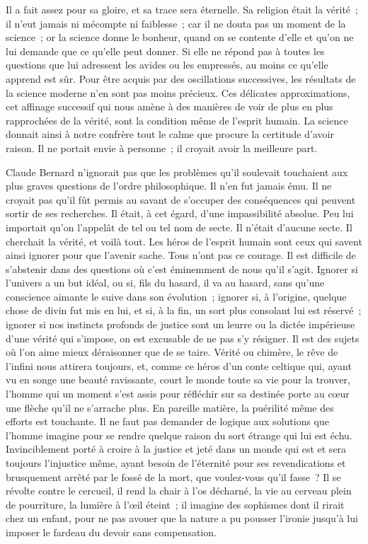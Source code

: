 \documentclass[french,twoside]{book} %
\newcommand\persName[1]{#1}
\begin{document}
Il a fait assez pour sa gloire, et sa trace sera éternelle. Sa religion était la vérité ; il n’eut jamais ni mécompte ni faiblesse ; car il ne douta pas un moment de la science ; or la science donne le bonheur, quand on se contente d’elle et qu’on ne lui demande que ce qu’elle peut donner. Si elle ne répond pas à toutes les questions que lui adressent les avides ou les empressés, au moins ce qu’elle apprend est sûr. Pour être acquis par des oscillations successives, les résultats de la science moderne n’en sont pas moins précieux. Ces délicates approximations, cet affinage successif qui nous amène à des manières de voir de plus en plus rapprochées de la vérité, sont la condition même de l’esprit humain. La science donnait ainsi à notre confrère tout le calme que procure la certitude d’avoir raison. Il ne portait envie à personne ; il croyait avoir la meilleure part.\par
{\persName Claude Bernard} n’ignorait pas que les problèmes qu’il soulevait touchaient aux plus graves questions de l’ordre philosophique. Il n’en fut jamais ému. Il ne croyait pas qu’il fût permis au savant de s’occuper des conséquences qui peuvent sortir de ses recherches. Il était, à cet égard, d’une impassibilité absolue. Peu lui importait qu’on l’appelât de tel ou tel nom de secte. Il n’était d’aucune secte. Il cherchait la vérité, et voilà tout. Les héros de l’esprit humain sont ceux qui savent ainsi ignorer pour que l’avenir sache. Tous n’ont pas ce courage. Il est difficile de s’abstenir dans des questions où c’est éminemment de nous qu’il s’agit. Ignorer si l’univers a un but idéal, ou si, fils du hasard, il va au hasard, sans qu’une conscience aimante le suive dans son évolution ; ignorer si, à l’origine, quelque chose de divin fut mis en lui, et si, à la fin, un sort plus consolant lui est réservé ; ignorer si nos instincts profonds de justice sont un leurre ou la dictée impérieuse d’une vérité qui s’impose, on est excusable de ne pas s’y résigner. Il est des sujets où l’on aime mieux déraisonner que de se taire. Vérité ou chimère, le rêve de l’infini nous attirera toujours, et, comme ce héros d’un conte celtique qui, ayant vu en songe une beauté ravissante, court le monde toute sa vie pour la trouver, l’homme qui un moment s’est assis pour réfléchir sur sa destinée porte au cœur une flèche qu’il ne s’arrache plus. En pareille matière, la puérilité même des efforts est touchante. Il ne faut pas demander de logique aux solutions que l’homme imagine pour se rendre quelque raison du sort étrange qui lui est échu. Invinciblement porté à croire à la justice et jeté dans un monde qui est et sera toujours l’injustice même, ayant besoin de l’éternité pour ses revendications et brusquement arrêté par le fossé de la mort, que voulez-vous qu’il fasse ? Il se révolte contre le cercueil, il rend la chair à l’os décharné, la vie au cerveau plein de pourriture, la lumière à l’œil éteint ; il imagine des sophismes dont il rirait chez un enfant, pour ne pas avouer que la nature a pu pousser l’ironie jusqu’à lui imposer le fardeau du devoir sans compensation.\par
\end{document}
